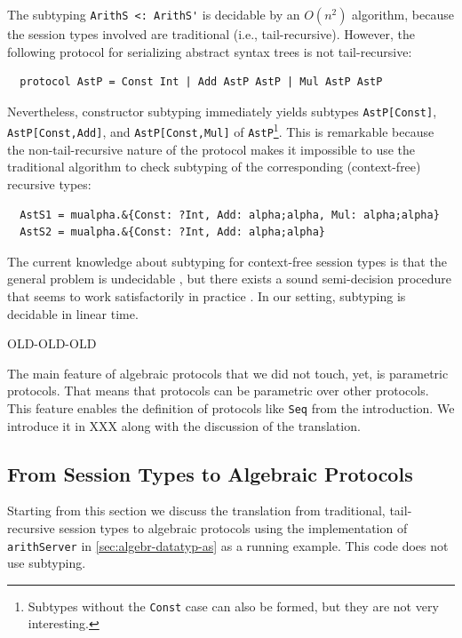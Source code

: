 The subtyping \lstinline+ArithS <: ArithS'+ is decidable by an
$O(n^2)$ algorithm, because the session types involved are traditional
(i.e., tail-recursive). However, the following protocol for serializing abstract
syntax trees is not tail-recursive:
\begin{lstlisting}
  protocol AstP = Const Int | Add AstP AstP | Mul AstP AstP
\end{lstlisting}
Nevertheless, constructor subtyping immediately yields subtypes \lstinline+AstP[Const]+,
\lstinline+AstP[Const,Add]+, and \lstinline+AstP[Const,Mul]+ of
\lstinline+AstP+\footnote{Subtypes without the \lstinline{Const} case
  can also be formed, but they are not very interesting.}. This is remarkable because the non-tail-recursive
nature of the protocol makes it impossible to use the traditional
algorithm to check subtyping of the corresponding (context-free)
recursive types:
\begin{lstlisting}
  AstS1 = mualpha.&{Const: ?Int, Add: alpha;alpha, Mul: alpha;alpha}
  AstS2 = mualpha.&{Const: ?Int, Add: alpha;alpha}
\end{lstlisting}
The current knowledge about subtyping for context-free session types
is that the general problem is undecidable
\cite{DBLP:journals/toplas/Padovani19}, but there exists a
sound semi-decision procedure that seems to work satisfactorily in
practice \cite{DBLP:conf/concur/SilvaMV23}. In our setting, subtyping
is decidable in linear time.

OLD-OLD-OLD

The main feature of algebraic protocols that we did not touch, yet, is
parametric protocols. That means that protocols can be parametric over
other protocols. This feature enables the definition of protocols like
\lstinline+Seq+ from the introduction. We introduce it in XXX along
with the discussion of the translation.


\subsection{From Session Types to Algebraic Protocols}
\label{sec:param-prot}

Starting from  this section we discuss the translation from
traditional, tail-recursive session types to algebraic protocols using
the implementation of \lstinline+arithServer+ in
\cref{sec:algebr-datatyp-as} as a running example.
This code does not use subtyping.

